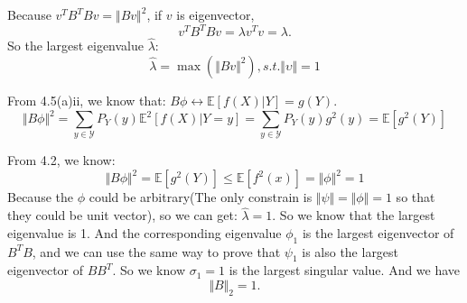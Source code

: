\documentclass[a4paper]{article}
\begin{document}
Because $v^TB^TBv = \Vert Bv \Vert^2$, if $v$ is eigenvector, $$ v^TB^TBv  = \lambda v^T v = \lambda .$$
So the largest eigenvalue $\hat \lambda$:$$\hat \lambda=\max(\Vert Bv \Vert^2),s.t. \Vert \upsilon \Vert = 1$$

From 4.5(a)ii, we know that: $B\phi \leftrightarrow \mathbb{E}[f(X)|Y] = g(Y)$.
$$
\Vert B\phi\Vert^2 = \sum_{y \in \mathcal{Y}} P_Y(y)\mathbb{E}^2[f(X)|Y=y] = \sum_{y \in \mathcal{Y}} P_Y(y)g^2(y)=\mathbb{E}[g^2(Y)]
$$

From 4.2, we know:
$$
\Vert B\phi\Vert^2 = \mathbb{E}[g^2(Y)] \leq \mathbb{E}[f^2(x)]=\Vert \phi \Vert^2 = 1
$$
Because the $\phi$ could be arbitrary(The only constrain is $\Vert\psi\Vert=\Vert \phi \Vert=1$ so that they could be unit vector), so we can get: $\hat \lambda = 1$.
So we know that the largest eigenvalue is 1. And the corresponding eigenvalue $\phi_1$ is the largest eigenvector of $B^TB$,  and we can use the same way to prove that $\psi_1$ is also the largest eigenvector of $BB^T$. So we know $\sigma_1 = 1$ is the largest singular value. And we have $$\Vert B\Vert_2=1.$$
\end{document}
